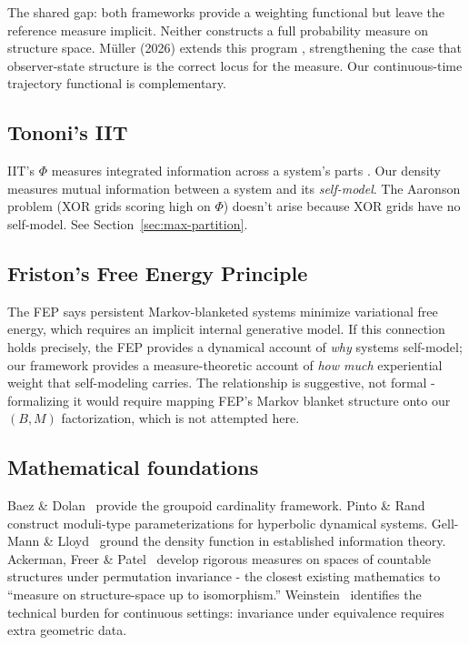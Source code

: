 \documentclass[12pt]{article}
\theoremstyle{remark}
\begin{document}
The shared gap: both frameworks provide a weighting functional but leave the reference measure implicit. Neither constructs a full probability measure on structure space. M\"uller (2026) extends this program \cite{mueller2026}, strengthening the case that observer-state structure is the correct locus for the measure. Our continuous-time trajectory functional is complementary.

\subsection{Tononi's IIT}

IIT's $\Phi$ measures integrated information across a system's parts \cite{tononi2016}. Our density measures mutual information between a system and its \emph{self-model}. The Aaronson problem (XOR grids scoring high on $\Phi$) doesn't arise because XOR grids have no self-model. See Section~\ref{sec:max-partition}.

\subsection{Friston's Free Energy Principle}

The FEP says persistent Markov-blanketed systems minimize variational free energy, which requires an implicit internal generative model. If this connection holds precisely, the FEP provides a dynamical account of \emph{why} systems self-model; our framework provides a measure-theoretic account of \emph{how much} experiential weight that self-modeling carries. The relationship is suggestive, not formal - formalizing it would require mapping FEP's Markov blanket structure onto our $(B, M)$ factorization, which is not attempted here.

\subsection{Mathematical foundations}

Baez \& Dolan~\cite{baez-dolan2001} provide the groupoid cardinality framework. Pinto \& Rand~\cite{pinto-rand2006} construct moduli-type parameterizations for hyperbolic dynamical systems. Gell-Mann \& Lloyd~\cite{gellmann-lloyd1996} ground the density function in established information theory. Ackerman, Freer \& Patel~\cite{ackerman2016} develop rigorous measures on spaces of countable structures under permutation invariance - the closest existing mathematics to ``measure on structure-space up to isomorphism.'' Weinstein~\cite{weinstein2009} identifies the technical burden for continuous settings: invariance under equivalence requires extra geometric data.
\end{document}
